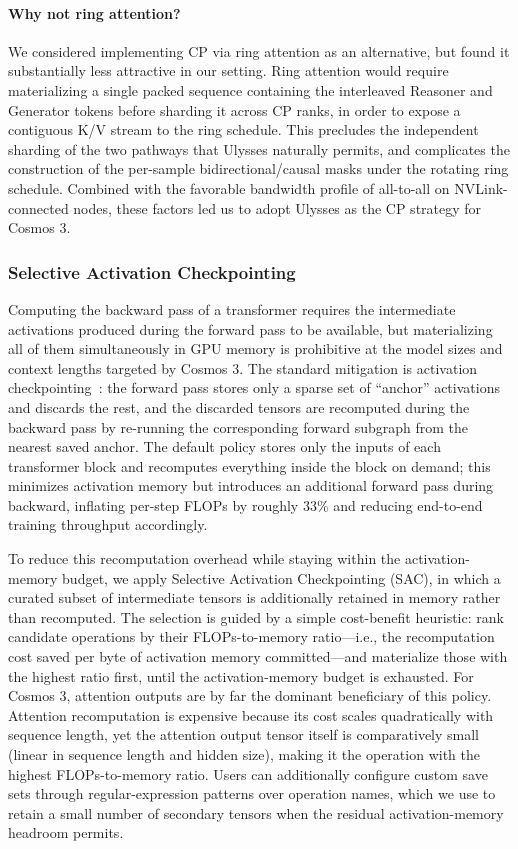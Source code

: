 \paragraph{Why not ring attention?}

We considered implementing CP via ring attention as an alternative, but found it substantially less attractive in our setting. Ring attention would require materializing a single packed sequence containing the interleaved Reasoner and Generator tokens before sharding it across CP ranks, in order to expose a contiguous K/V stream to the ring schedule. This precludes the independent sharding of the two pathways that Ulysses naturally permits, and complicates the construction of the per-sample bidirectional/causal masks under the rotating ring schedule. Combined with the favorable bandwidth profile of all-to-all on NVLink-connected nodes, these factors led us to adopt Ulysses as the CP strategy for Cosmos 3.

\subsubsection{Selective Activation Checkpointing}

Computing the backward pass of a transformer requires the intermediate activations produced during the forward pass to be available, but materializing all of them simultaneously in GPU memory is prohibitive at the model sizes and context lengths targeted by Cosmos 3. The standard mitigation is activation checkpointing~\citep{sac}: the forward pass stores only a sparse set of ``anchor'' activations and discards the rest, and the discarded tensors are recomputed during the backward pass by re-running the corresponding forward subgraph from the nearest saved anchor. The default policy stores only the inputs of each transformer block and recomputes everything inside the block on demand; this minimizes activation memory but introduces an additional forward pass during backward, inflating per-step FLOPs by roughly $33\%$ and reducing end-to-end training throughput accordingly.

To reduce this recomputation overhead while staying within the activation-memory budget, we apply Selective Activation Checkpointing (SAC), in which a curated subset of intermediate tensors is additionally retained in memory rather than recomputed. The selection is guided by a simple cost-benefit heuristic: rank candidate operations by their FLOPs-to-memory ratio---i.e., the recomputation cost saved per byte of activation memory committed---and materialize those with the highest ratio first, until the activation-memory budget is exhausted. For Cosmos 3, attention outputs are by far the dominant beneficiary of this policy. Attention recomputation is expensive because its cost scales quadratically with sequence length, yet the attention output tensor itself is comparatively small (linear in sequence length and hidden size), making it the operation with the highest FLOPs-to-memory ratio. Users can additionally configure custom save sets through regular-expression patterns over operation names, which we use to retain a small number of secondary tensors when the residual activation-memory headroom permits.

